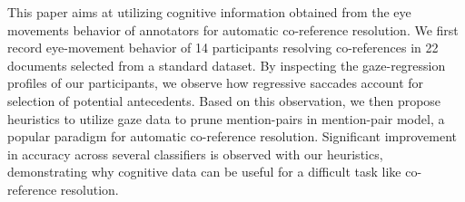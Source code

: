 This paper aims at utilizing cognitive information obtained from the eye movements behavior of annotators for automatic co-reference resolution. We first record eye-movement behavior of 14 participants resolving co-references in 22 documents selected from a standard dataset. By inspecting the gaze-regression profiles of our participants, we observe how regressive saccades account for selection of potential antecedents. Based on this observation, we then propose heuristics to utilize gaze data to prune mention-pairs in  mention-pair model, a popular paradigm for automatic co-reference resolution. Significant improvement in accuracy across several classifiers is observed with our heuristics, demonstrating why cognitive data can be useful for a difficult task like co-reference resolution.
